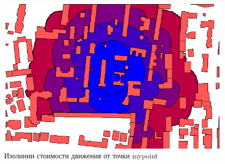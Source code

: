 \begin{frame}
\begin{enumerate}
\begin{enumerate}
\begin{figure}[!ht]
\begin{center}
                    \includegraphics[width=0.8\columnwidth]{./practic/img/vector_cum_cost}
                \end{center}
                \caption{Изолинии стоимости движения от точки mypoint}
            \end{figure}
        \end{enumerate}
    \end{enumerate}
\end{frame}

